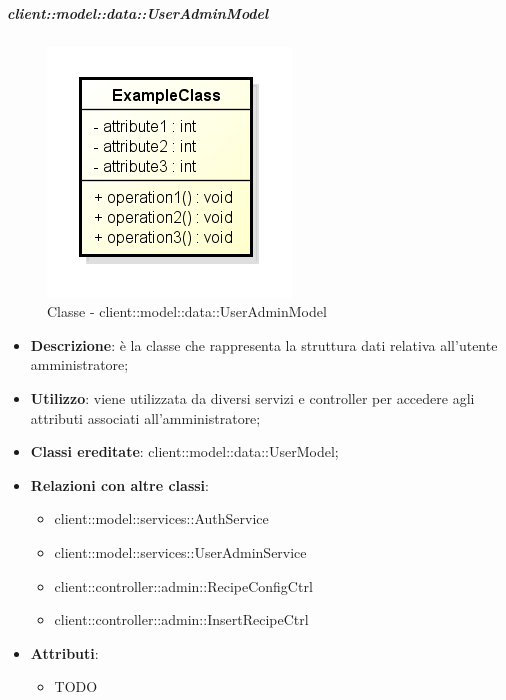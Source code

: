 		\subparagraph{client::model::data::UserAdminModel} %
		\label{subp:client_model_data_useradminmodel}
			\begin{figure}[htbp]
				\centering
				\centerline{\includegraphics[scale=0.7]{./images/client/classes/example_class.png}}
				\caption{Classe - client::model::data::UserAdminModel}
			\end{figure}
			\begin{itemize}
				\item \textbf{Descrizione}: è la classe che rappresenta la struttura dati relativa all'utente amministratore;
				\item \textbf{Utilizzo}: viene utilizzata da diversi servizi e controller per accedere agli attributi associati all'amministratore;
				\item \textbf{Classi ereditate}: client::model::data::UserModel;
				\item \textbf{Relazioni con altre classi}:
					\begin{itemize}
						\item client::model::services::AuthService
						\item client::model::services::UserAdminService
						\item client::controller::admin::RecipeConfigCtrl
						\item client::controller::admin::InsertRecipeCtrl
					\end{itemize}
				\item \textbf{Attributi}:
					\begin{itemize}
						\item TODO
					\end{itemize}
			\end{itemize}

